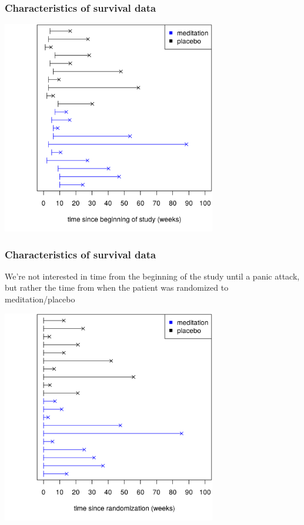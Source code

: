 \documentclass[10pt,t]{beamer}
\begin{document}
\begin{frame}
\frametitle{Characteristics of survival data}
\centering
\includegraphics[width=0.7\textwidth]{figs/meditation_observed_study_time.png}
\end{frame}

\begin{frame}
\frametitle{Characteristics of survival data}
\vspace{-0.8cm}
We're not interested in time from the beginning of the study until a panic attack, but rather the time from when the patient was randomized to meditation/placebo
\begin{center}
\includegraphics[width=0.7\textwidth]{figs/meditation_observed_rand_time.png}
\end{center}
\end{frame}
\end{document}
